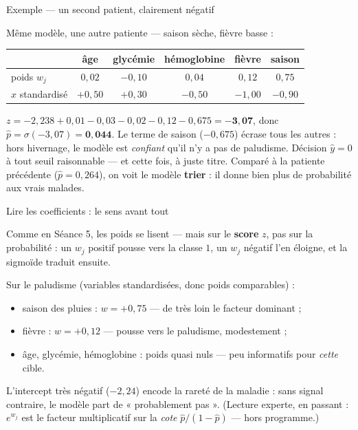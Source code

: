 \documentclass[aspectratio=169,11pt]{beamer}
\begin{document}
\begin{frame}{Exemple — un second patient, clairement négatif}
\begin{ucadex}
{\small Même modèle, une autre patiente — saison sèche, fièvre basse :
\begin{center}\footnotesize\renewcommand{\arraystretch}{1.05}\begin{tabular}{l|ccccc}
 & âge & glycémie & hémoglobine & fièvre & saison\\\hline
poids $w_j$ & $0{,}02$ & $-0{,}10$ & $0{,}04$ & $0{,}12$ & $0{,}75$\\
$x$ standardisé & $+0{,}50$ & $+0{,}30$ & $-0{,}50$ & $-1{,}00$ & $-0{,}90$\\
\end{tabular}\end{center}
$z = -2{,}238 + 0{,}01 - 0{,}03 - 0{,}02 - 0{,}12 - 0{,}675 = \mathbf{-3{,}07}$, donc $\hat p = \sigma(-3{,}07) = \mathbf{0{,}044}$. Le terme de saison ($-0{,}675$) écrase tous les autres : hors hivernage, le modèle est \emph{confiant} qu'il n'y a pas de paludisme. Décision $\hat y = 0$ à tout seuil raisonnable — et cette fois, à juste titre. Comparé à la patiente précédente ($\hat p = 0{,}264$), on voit le modèle \textbf{trier} : il donne bien plus de probabilité aux vrais malades.}
\end{ucadex}
\end{frame}

\begin{frame}{Lire les coefficients : le sens avant tout}
\begin{ucaddef}
{\small Comme en Séance 5, les poids se lisent — mais sur le \textbf{score} $z$, pas sur la probabilité : un $w_j$ positif pousse vers la classe $1$, un $w_j$ négatif l'en éloigne, et la sigmoïde traduit ensuite.}
\end{ucaddef}
{\small Sur le paludisme (variables standardisées, donc poids comparables) :}
\begin{itemize}\small
  \item saison des pluies : $w = +0{,}75$ — de très loin le facteur dominant ;
  \item fièvre : $w = +0{,}12$ — pousse vers le paludisme, modestement ;
  \item âge, glycémie, hémoglobine : poids quasi nuls — peu informatifs pour \emph{cette} cible.
\end{itemize}
{\small L'intercept très négatif ($-2{,}24$) encode la rareté de la maladie : sans signal contraire, le modèle part de « probablement pas ». (Lecture experte, en passant : $e^{w_j}$ est le facteur multiplicatif sur la \emph{cote} $\hat p/(1-\hat p)$ — hors programme.)}
\end{frame}
\end{document}
